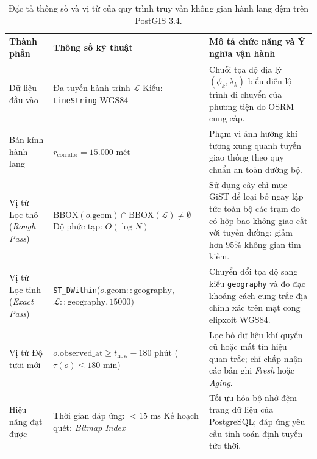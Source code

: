 \begin{table}[H]
\centering
\small
\caption[Đặc tả thông số truy vấn không gian hành lang đệm PostGIS]{Đặc tả thông số và vị từ của quy trình truy vấn không gian hành lang đệm trên PostGIS 3.4.}
\label{tab:gist_query_spec_vi}
\begin{tabularx}{\textwidth}{>{\raggedright\arraybackslash}p{2.6cm} >{\raggedright\arraybackslash}p{4.0cm} X}
\toprule
\textbf{Thành phần} & \textbf{Thông số kỹ thuật} & \textbf{Mô tả chức năng và Ý nghĩa vận hành} \\
\midrule
Dữ liệu đầu vào & Đa tuyến hành trình $\mathcal{L}$ \newline Kiểu: \texttt{LineString} WGS84 & Chuỗi tọa độ địa lý $(\phi_k, \lambda_k)$ biểu diễn lộ trình di chuyển của phương tiện do OSRM cung cấp. \\
\addlinespace
Bán kính hành lang & $r_{\text{corridor}} = 15.000\text{ mét}$ & Phạm vi ảnh hưởng khí tượng xung quanh tuyến giao thông theo quy chuẩn an toàn đường bộ. \\
\addlinespace
Vị từ Lọc thô \newline (\textit{Rough Pass}) & $\text{BBOX}(o.\text{geom}) \cap \text{BBOX}(\mathcal{L}) \ne \emptyset$ \newline Độ phức tạp: $O(\log N)$ & Sử dụng cây chỉ mục GiST để loại bỏ ngay lập tức toàn bộ các trạm đo có hộp bao không giao cắt với tuyến đường; giảm hơn 95\% không gian tìm kiếm. \\
\addlinespace
Vị từ Lọc tinh \newline (\textit{Exact Pass}) & \texttt{ST\_DWithin}($o.\text{geom}::\text{geography}$, \newline $\mathcal{L}::\text{geography}, 15000)$ & Chuyển đổi tọa độ sang kiểu \texttt{geography} và đo đạc khoảng cách cung trắc địa chính xác trên mặt cong elipxoit WGS84. \\
\addlinespace
Vị từ Độ tươi mới & $o.\text{observed\_at} \ge t_{\text{now}} - 180\text{ phút}$ \newline ($\tau(o) \le 180\text{ min}$) & Lọc bỏ dữ liệu khí quyển cũ hoặc mất tín hiệu quan trắc; chỉ chấp nhận các bản ghi \textit{Fresh} hoặc \textit{Aging}. \\
\addlinespace
Hiệu năng đạt được & Thời gian đáp ứng: $< 15\text{ ms}$ \newline Kế hoạch quét: \textit{Bitmap Index} & Tối ưu hóa bộ nhớ đệm trang dữ liệu của PostgreSQL; đáp ứng yêu cầu tính toán định tuyến tức thời. \\
\bottomrule
\end{tabularx}
\end{table}

